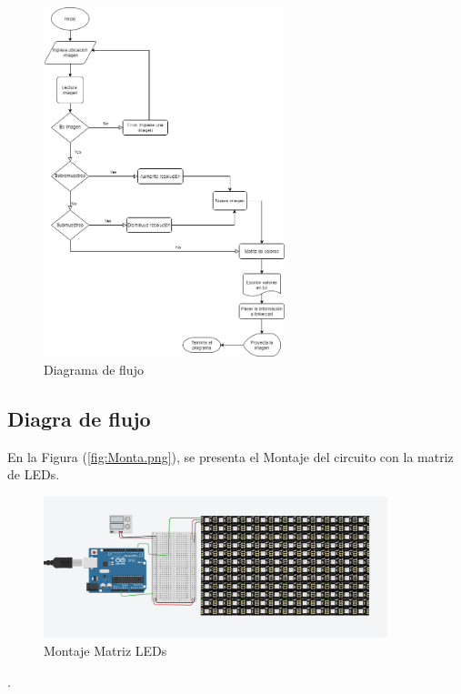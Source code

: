 \documentclass{article}
\begin{document}
\begin{figure}[h]
\includegraphics[width=7cm]{Diagramaparcial.png}
\centering
\caption{Diagrama de flujo}
\label{fig:Diagramaparcial.png}
\end{figure}
\subsection{Diagra de flujo}
En la Figura (\ref{fig:Monta.png}), se presenta el Montaje del circuito con la matriz de LEDs.

\begin{figure}[h]
\includegraphics[width=10cm]{Montaje.png}
\centering
\caption{Montaje Matriz LEDs}
\label{fig:Montaje.png}
\end{figure}


\cite{Digitalizacionwebsite}.\\\\

\end{document}
